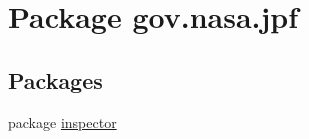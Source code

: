 \hypertarget{namespacegov_1_1nasa_1_1jpf}{}\section{Package gov.\+nasa.\+jpf}
\label{namespacegov_1_1nasa_1_1jpf}
\subsection*{Packages}
\begin{DoxyCompactItemize}
\item 
package \hyperlink{namespacegov_1_1nasa_1_1jpf_1_1inspector}{inspector}
\end{DoxyCompactItemize}
